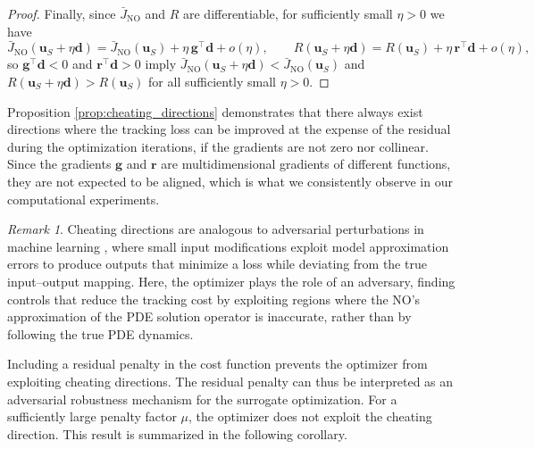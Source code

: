 \documentclass[final,1p,times]{elsarticle}
\theoremstyle{plain} %
\theoremstyle{definition} %
\theoremstyle{remark} %
\newtheorem{remark}[theorem]{Remark}
\begin{document}
\begin{proof}
\medskip\noindent
Finally, since $\bar{J}_{\mathrm{NO}}$ and $R$ are differentiable, for sufficiently small $\eta>0$ we have
\[
\bar{J}_{\mathrm{NO}}(\mathbf{u}_S+\eta \mathbf{d})=\bar{J}_{\mathrm{NO}}(\mathbf{u}_S)+\eta\, \mathbf{g}^\top \mathbf{d}+o(\eta),
\qquad
R(\mathbf{u}_S+\eta \mathbf{d})=R(\mathbf{u}_S)+\eta\, \mathbf{r}^\top \mathbf{d}+o(\eta),
\]
so $\mathbf{g}^\top \mathbf{d}<0$ and $\mathbf{r}^\top \mathbf{d}>0$ imply
$\bar{J}_{\mathrm{NO}}(\mathbf{u}_S+\eta \mathbf{d})<\bar{J}_{\mathrm{NO}}(\mathbf{u}_S)$ and
$R(\mathbf{u}_S+\eta \mathbf{d})>R(\mathbf{u}_S)$ for all sufficiently small $\eta>0$.
\end{proof}

Proposition \ref{prop:cheating_directions} demonstrates that there always exist directions where the tracking loss can be improved at the expense of the residual during the optimization iterations, if the gradients are not zero nor collinear.  Since the gradients $\mathbf{g}$ and $\mathbf{r}$ are multidimensional gradients of different functions, they are not expected to be aligned, which is what we consistently observe in our computational experiments. 

\begin{remark}
    Cheating directions are analogous to adversarial perturbations in machine learning \cite{goodfellow2015adversarial}, where small input modifications exploit model approximation errors to produce outputs that minimize a loss while deviating from the true input–output mapping. Here, the optimizer plays the role of an adversary, finding controls that reduce the tracking cost by exploiting regions where the NO's approximation of the PDE solution operator is inaccurate, rather than by following the true PDE dynamics.
\end{remark} 

Including a residual penalty in the cost function prevents the optimizer from exploiting cheating directions. The residual penalty can thus be interpreted as an adversarial robustness mechanism for the surrogate optimization. For a sufficiently large penalty factor $\mu$, the optimizer does not exploit the cheating direction. This result is summarized in the following corollary.
\end{document}
